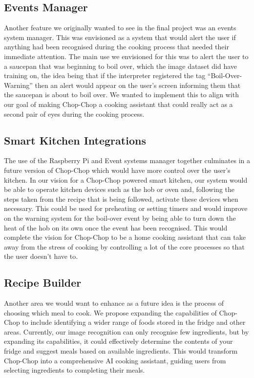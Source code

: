\documentclass{article}
\begin{document}
\subsection{Events Manager}
Another feature we originally wanted to see in the final project was an events system manager. This was envisioned as a system that would alert the user if anything had been recognised during the cooking process that needed their immediate attention. The main use we envisioned for this was to alert the user to a saucepan that was beginning to boil over, which the image dataset did have training on, the idea being that if the interpreter registered the tag “Boil-Over-Warning” then an alert would appear on the user’s screen informing them that the saucepan is about to boil over. We wanted to implement this to align with our goal of making Chop-Chop a cooking assistant that could really act as a second pair of eyes during the cooking process.
\subsection{Smart Kitchen Integrations}
The use of the Raspberry Pi and Event systems manager together culminates in a future version of Chop-Chop which would have more control over the user’s kitchen. In our vision for a Chop-Chop powered smart kitchen, our system would be able to operate kitchen devices such as the hob or oven and, following the steps taken from the recipe that is being followed, activate these devices when necessary. This could be used for preheating or setting timers and would improve on the warning system for the boil-over event by being able to turn down the heat of the hob on its own once the event has been recognised. This would complete the vision for Chop-Chop to be a home cooking assistant that can take away from the stress of cooking by controlling a lot of the core processes so that the user doesn’t have to.
\subsection{Recipe Builder}
Another area we would want to enhance as a future idea is the process of choosing which meal to cook. We propose expanding the capabilities of Chop-Chop to include identifying a wider range of foods stored in the fridge and other areas. Currently, our image recognition can only recognise few ingredients, but by expanding its capabilities, it could effectively determine the contents of your fridge and suggest meals based on available ingredients. This would transform Chop-Chop into a comprehensive AI cooking assistant, guiding users from selecting ingredients to completing their meals.
\end{document}
